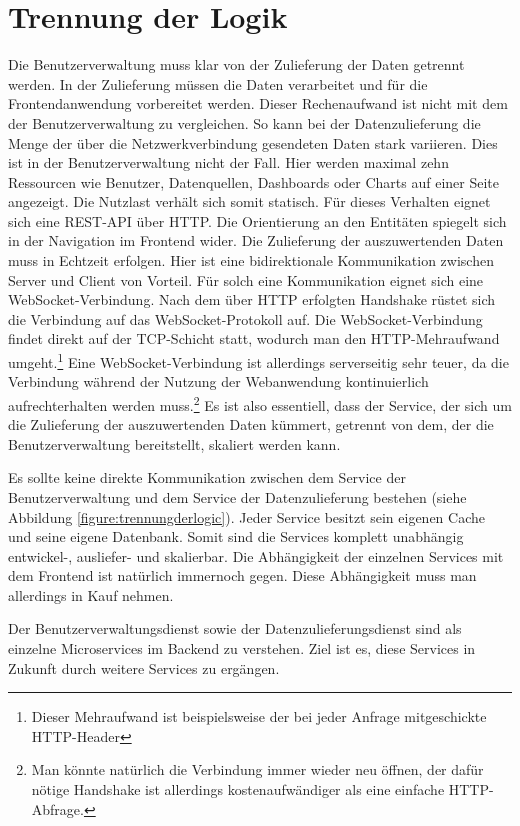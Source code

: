 \section{Trennung der Logik}
\label{sec:trennungderlogik}
Die Benutzerverwaltung muss klar von der Zulieferung der Daten getrennt werden.
In der Zulieferung müssen die Daten verarbeitet und für die Frontendanwendung
vorbereitet werden. Dieser Rechenaufwand ist nicht mit dem der Benutzerverwaltung
zu vergleichen. So kann bei der Datenzulieferung die Menge der über die Netzwerkverbindung
gesendeten Daten stark variieren. Dies ist in der Benutzerverwaltung nicht der Fall. 
Hier werden maximal zehn Ressourcen wie Benutzer, Datenquellen, Dashboards oder Charts
auf einer Seite angezeigt. Die Nutzlast verhält sich somit statisch. Für dieses Verhalten
eignet sich eine REST-API über HTTP. Die Orientierung an den Entitäten spiegelt sich in der Navigation
im Frontend wider. Die Zulieferung der auszuwertenden Daten muss in Echtzeit erfolgen.
Hier ist eine bidirektionale Kommunikation zwischen Server und Client von Vorteil.
Für solch eine Kommunikation eignet sich eine WebSocket-Verbindung. Nach dem über HTTP erfolgten
Handshake rüstet sich die Verbindung auf das WebSocket-Protokoll auf. Die WebSocket-Verbindung
findet direkt auf der TCP-Schicht statt, wodurch man den HTTP-Mehraufwand umgeht.\footnote{Dieser Mehraufwand ist beispielsweise der bei jeder Anfrage mitgeschickte HTTP-Header}
Eine WebSocket-Verbindung ist allerdings serverseitig sehr teuer, da die Verbindung während der Nutzung
der Webanwendung kontinuierlich aufrechterhalten werden muss.\footnote{Man könnte natürlich die Verbindung immer wieder neu öffnen, der dafür nötige Handshake ist allerdings kostenaufwändiger als eine einfache HTTP-Abfrage.} 
Es ist also essentiell, dass der Service, der sich um die Zulieferung der auszuwertenden Daten kümmert,
getrennt von dem, der die Benutzerverwaltung bereitstellt, skaliert werden kann.

Es sollte keine direkte Kommunikation zwischen dem Service der Benutzerverwaltung und dem
Service der Datenzulieferung bestehen (siehe Abbildung \ref{figure:trennungderlogic}).
Jeder Service besitzt sein eigenen Cache und seine eigene Datenbank. Somit sind
die Services komplett unabhängig entwickel-, ausliefer- und skalierbar. Die Abhängigkeit der einzelnen
Services mit dem Frontend ist natürlich immernoch gegen. Diese Abhängigkeit muss man
allerdings in Kauf nehmen.

Der Benutzerverwaltungsdienst sowie der Datenzulieferungsdienst sind als einzelne Microservices
im Backend zu verstehen. Ziel ist es, diese Services in Zukunft durch weitere Services zu ergängen.

